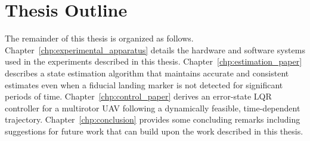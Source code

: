 \section{Thesis Outline}

The remainder of this thesis is organized as follows.
Chapter~\ref{chp:experimental_apparatus} details the hardware and software
systems used
in the experiments described in this thesis. Chapter~\ref{chp:estimation_paper}
describes a state
estimation algorithm that maintains accurate and consistent estimates even when
a fiducial landing marker is not detected for significant periods of time.
Chapter~\ref{chp:control_paper} derives an error-state LQR controller for a
multirotor UAV following a dynamically feasible, time-dependent trajectory.
Chapter~\ref{chp:conclusion} provides some concluding remarks including
suggestions for future work that can build upon the work described in this
thesis.
